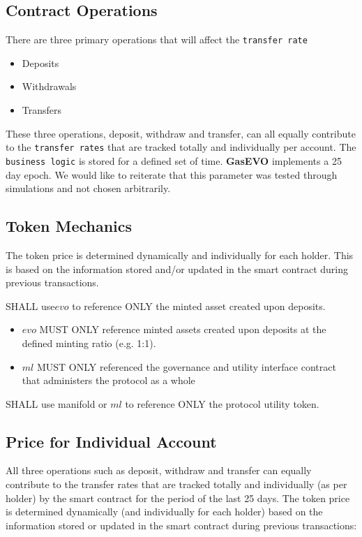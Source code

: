 \subsection{Contract Operations}

There are three primary operations that will affect the \texttt{transfer rate}

\begin{itemize}
	\item Deposits
	\item Withdrawals 
	\item Transfers
\end{itemize}


These three operations, deposit, withdraw and transfer,  can all equally contribute to
the \texttt{transfer rates} that are tracked totally and individually per account. The \texttt{business logic} is stored for a defined set of time. \textbf{GasEVO} implements a 25 day epoch. We would like to reiterate that this parameter was tested through simulations and not chosen arbitrarily. 

\subsection{Token Mechanics}
The token price is determined dynamically and individually for each holder. This is based on the
information stored and/or updated in the smart contract during previous transactions. 

SHALL use$ evo$ to reference ONLY the minted asset created upon deposits.
\linebreak

\begin{itemize}
	\item $evo$ MUST ONLY reference minted assets created upon deposits at the defined minting ratio (e.g. 1:1).
	\item $ml$ MUST ONLY referenced the governance and utility interface contract that administers the protocol as a whole
\end{itemize}

SHALL use  manifold  or $ml$ to reference ONLY the protocol utility token.

\newpage
\subsection{Price for Individual Account} 
All three operations such as deposit, withdraw and transfer can equally contribute to the transfer rates that are tracked totally and individually (as per holder)
by the smart contract for the period of the last 25 days. The token price is determined dynamically (and individually for each holder) based on the information stored or updated in the smart contract during previous transactions:

